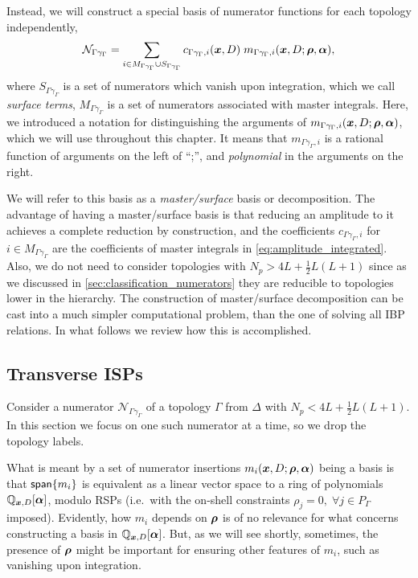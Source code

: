 Instead, we will construct a special basis of numerator functions for each topology independently,
\begin{equation} \label{eq:master_surface_basis}
  \mathcal{N}_{\Gamma \gamma_\Gamma} = \sum_{i \in M_{\Gamma\gamma_\Gamma} \cup S_{\Gamma\gamma_\Gamma}} c_{\Gamma\gamma_\Gamma, i}(\vb*{x},D) \; m_{\Gamma\gamma_\Gamma, i} (\vb*{x},D;\vb*{\rho},\vb*{\alpha}),
\end{equation}
where $S_{\Gamma\gamma_\Gamma}$ is a set of numerators which vanish upon integration, which we call \emph{surface terms}, $M_{\Gamma\gamma_\Gamma}$ is a set of numerators associated with master integrals.
Here, we introduced a notation for distinguishing the arguments of $m_{\Gamma\gamma_\Gamma, i} (\vb*{x},D;\vb*{\rho},\vb*{\alpha})$,
which we will use throughout this chapter. 
It means that $m_{\Gamma\gamma_\Gamma, i}$ is a rational function of arguments on the left of ``;'', and \emph{polynomial} in the arguments on the right. 

We will refer to this basis as a \emph{master/surface} basis or decomposition.
The advantage of having a master/surface basis is that
reducing an amplitude to it achieves
a complete reduction by construction,
and the coefficients $c_{\Gamma\gamma_\Gamma,i}$ for $i\in M_{\Gamma\gamma_\Gamma}$ are the coefficients
of master integrals in \cref{eq:amplitude_integrated}.
Also, we do not need to consider topologies with $N_p > 4L + \frac{1}{2}L(L+1)$ since as we discussed in \cref{sec:classification_numerators}
they are reducible to topologies lower in the hierarchy.
The construction of master/surface decomposition can be cast into a much simpler computational problem, than the one of solving all IBP relations.
In what follows we review how this is accomplished.


\subsection{Transverse ISPs}
\label{sec:traceless_completion}

Consider a numerator $\mathcal{N}_{\Gamma\gamma_\Gamma}$ of a topology $\Gamma$ from $\Delta$ with $N_p <  4L + \frac{1}{2}L(L+1)$.
In this section we focus on one such numerator at a time, so we drop the topology labels.

What is meant by a set of numerator insertions $m_{i}(\vb*{x},D;\vb*{\rho},\vb*{\alpha})$ being a basis is that
$\mathsf{span}\{m_{i}\}$ is equivalent as a linear vector space to a ring of polynomials $\mathbb{Q}_{\vb*{x},D}[\vb*{\alpha}]$,
modulo RSPs (i.e.\ with the on-shell constraints $\rho_j = 0,\;\forall j\in P_\Gamma$ imposed).
Evidently, how $m_{i}$ depends on $\vb*{\rho}$ is of no relevance for what concerns constructing
a basis in $\mathbb{Q}_{\vb*{x},D}[\vb*{\alpha}]$. But, as we will see shortly, sometimes, the presence
of $\vb*{\rho}$ might be important for ensuring other features of $m_{i}$, such as vanishing
upon integration.

